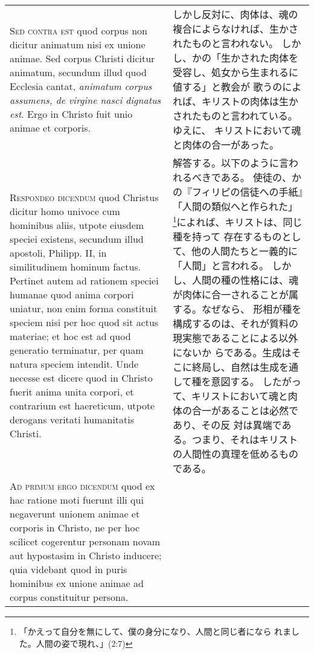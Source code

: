\documentclass[10pt]{jsarticle} %
\begin{document}
\begin{longtable}{p{21em}p{21em}}
\\



{\scshape Sed contra est} quod corpus non dicitur animatum nisi ex unione
animae. Sed corpus Christi dicitur animatum, secundum illud quod
Ecclesia cantat, {\itshape animatum corpus assumens, de virgine nasci dignatus
est}. Ergo in Christo fuit unio animae et corporis.


&

しかし反対に、肉体は、魂の複合によらなければ、生かされたものと言われない。
 しかし、かの「生かされた肉体を受容し、処女から生まれるに値する」と教会が
 歌うのによれば、キリストの肉体は生かされたものと言われている。ゆえに、
 キリストにおいて魂と肉体の合一があった。

\\



{\scshape Respondeo dicendum} quod Christus dicitur homo univoce cum hominibus
aliis, utpote eiusdem speciei existens, secundum illud apostoli,
Philipp. II, in similitudinem hominum factus. Pertinet autem ad rationem
speciei humanae quod anima corpori uniatur, non enim forma constituit
speciem nisi per hoc quod sit actus materiae; et hoc est ad quod
generatio terminatur, per quam natura speciem intendit. Unde necesse est
dicere quod in Christo fuerit anima unita corpori, et contrarium est
haereticum, utpote derogans veritati humanitatis Christi.


&

解答する。以下のように言われるべきである。
使徒の、かの『フィリピの信徒への手紙』「人間の類似へと作られた」
 \footnote{「かえって自分を無にして、僕の身分になり、人間と同じ者になら
 れました。人間の姿で現れ、」(2:7)}によれば、キリストは、同じ種を持って
 存在するものとして、他の人間たちと一義的に「人間」と言われる。
しかし、人間の種の性格には、魂が肉体に合一されることが属する。なぜなら、
 形相が種を構成するのは、それが質料の現実態であることによる以外にないか
 らである。生成はそこに終局し、自然は生成を通して種を意図する。
したがって、キリストにおいて魂と肉体の合一があることは必然であり、その反
 対は異端である。つまり、それはキリストの人間性の真理を低めるものである。


\\



{\scshape Ad primum ergo dicendum} quod ex hac ratione moti fuerunt illi qui
negaverunt unionem animae et corporis in Christo, ne per hoc scilicet
cogerentur personam novam aut hypostasim in Christo inducere; quia
videbant quod in puris hominibus ex unione animae ad corpus constituitur
persona. 



\end{longtable}
\end{document}
